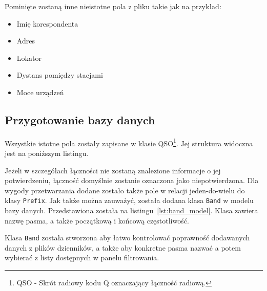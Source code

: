 \documentclass[]{mgr}
\begin{document}
            Pominięte zostaną inne nieistotne pola z pliku takie jak na przykład:
            \begin{itemize}
                \item Imię korespondenta
                \item Adres
                \item Lokator
                \item Dystans pomiędzy stacjami
                \item Moce urządzeń
            \end{itemize}

            \subsection{Przygotowanie bazy danych}
            Wszystkie istotne pola zostały zapisane w klasie QSO\footnote{QSO - Skrót radiowy kodu Q oznaczający łączność radiową.}. Jej struktura widoczna jest na poniższym listingu.

            

            Jeżeli w szczegółach łączności nie zostaną znalezione informacje o jej potwierdzeniu, łączność domyślnie zostanie oznaczona jako niepotwierdzona. Dla wygody przetwarzania dodane zostało także pole w relacji jeden-do-wielu do klasy \texttt{Prefix}. Jak także można zauważyć, została dodana klasa \texttt{Band} w modelu bazy danych. Przedstawiona została na listingu~\ref{lst:band_model}. Klasa zawiera nazwę pasma, a także początkową i końcową częstotliwość.
            
            Klasa \texttt{Band} została stworzona aby łatwo kontrolować poprawność dodawanych danych z plików dzienników, a także aby konkretne pasma nazwać a potem wybierać z listy dostępnych w panelu filtrowania.
\end{document}
